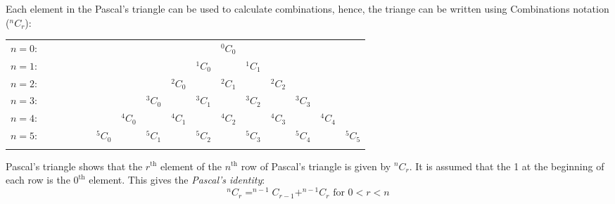 \documentclass[a4paper,10pt]{report}
\begin{document}
		Each element in the Pascal's triangle can be used to calculate combinations, hence, the triange can be written using Combinations notation ($^nC_r$):
		\begin{center}
			\begin{tabular}{rcccccccccccccccc}
				$n=0$:&    &    &    &    &    &    &    &    &    &    &  $^0C_0$\\\noalign{\smallskip\smallskip}
				$n=1$:&    &    &    &    &    &    &    &    &    &  $^1C_0$ &    &  $^1C_1$\\\noalign{\smallskip\smallskip}
				$n=2$:&    &    &    &    &    &    &    &    &  $^2C_0$ &    &  $^2C_1$ &    &  $^2C_2$\\\noalign{\smallskip\smallskip}
				$n=3$:&    &    &    &    &    &    &    &  $^3C_0$ &    &  $^3C_1$ &    &  $^3C_2$ &    &  $^3C_3$\\\noalign{\smallskip\smallskip}
				$n=4$:&    &    &    &    &    &    &  $^4C_0$ &    &  $^4C_1$ &    &  $^4C_2$ &    &  $^4C_3$ &    &  $^4C_4$\\\noalign{\smallskip\smallskip}
				$n=5$:&    &    &    &    &    &  $^5C_0$ &    &  $^5C_1$ &    & $^5C_2$ &    & $^5C_3$ &    &  $^5C_4$ &    &  $^5C_5$\\\noalign{\smallskip\smallskip}
			\end{tabular}
		\end{center}

		Pascal's triangle shows that the $r^\text{th}$ element of the $n^\text{th}$ row of Pascal's triangle is given by $^nC_r$.  It is assumed that the 1 at the beginning of each row is the $0^\text{th}$ element.  This gives the \emph{Pascal's identity}:
		$$^nC_r = ^{n-1}C_{r-1} + ^{n-1}C_r \text{ for } 0 < r < n$$




	
	
\end{document}
